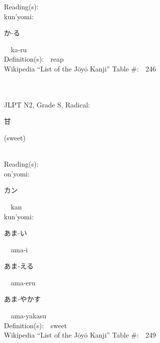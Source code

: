 \begin{multicols}{2}
Reading(s):\ \ \\
{\hspace*{1em}}kun'yomi:\ \ \\
{\hspace*{2em}}{\begin{CJK}{UTF8}{min} か-る \end{CJK}}\ \ ka-ru\ \ \\
Definition(s):\ \ reap \\
Wikipedia ``List of the J\=oy\=o Kanji'' Table \#:\ \ 246 \\
\ \ \\
{\fontsize{34pt}{40pt}  }\ \ \\  %
{JLPT N2, Grade S, Radical:\ \ {\begin{CJK}{UTF8}{min} 甘 \end{CJK}} (sweet) } \\
Reading(s):\ \ \\
{\hspace*{1em}}on'yomi:\ \ \\
{\hspace*{2em}}{\begin{CJK}{UTF8}{min} カン \end{CJK}}\ \ kan\ \ \\
{\hspace*{1em}}kun'yomi:\ \ \\
{\hspace*{2em}}{\begin{CJK}{UTF8}{min} あま-い \end{CJK}}\ \ ama-i\ \ \\
{\hspace*{2em}}{\begin{CJK}{UTF8}{min} あま-える \end{CJK}}\ \ ama-eru\ \ \\
{\hspace*{2em}}{\begin{CJK}{UTF8}{min} あま-やかす \end{CJK}}\ \ ama-yakasu\ \ \\
Definition(s):\ \ sweet \\
Wikipedia ``List of the J\=oy\=o Kanji'' Table \#:\ \ 249 \\
\ \ \\
{\fontsize{34pt}{40pt}  }\ \ \\  %

\end{multicols}

